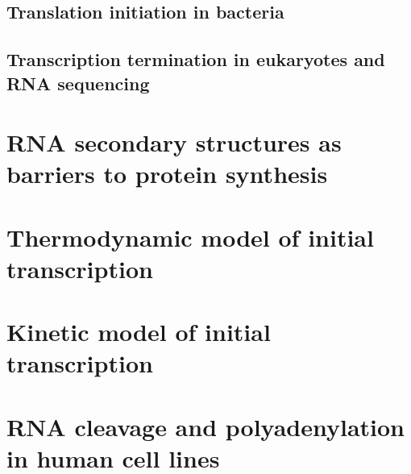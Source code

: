 \documentclass[]{ntnuthesis}
\begin{document}
\section{Translation initiation in bacteria}
\begin{refsection}

\printbibliography
\end{refsection}
\newpage

\begin{refsection}
\section{Transcription termination in eukaryotes and RNA sequencing}



\printbibliography
\end{refsection}
\newpage

\chapter{RNA secondary structures as barriers to protein synthesis}
\begin{refsection}
\label{chap:celB}

\printbibliography
\end{refsection}

\chapter{Thermodynamic model of initial transcription}
\begin{refsection}
\label{chap:initiation_paper}

\printbibliography
\end{refsection}

\chapter{Kinetic model of initial transcription}
\begin{refsection}
\label{chap:kinetic_paper_chapter}

\printbibliography
\end{refsection}

\chapter{RNA cleavage and polyadenylation in human cell lines}
\begin{refsection}
\label{chap:polyA}

\printbibliography
\end{refsection}
\end{document}
